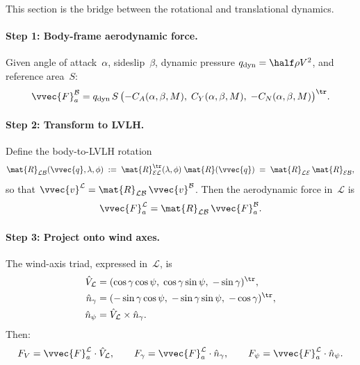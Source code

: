 This section is the bridge between the rotational and translational
dynamics.

\paragraph{Step 1: Body-frame aerodynamic force.}
Given angle of attack~$\alpha$, sideslip~$\beta$, dynamic pressure
$q_{\mathrm{dyn}} = \half\rho V^2$, and reference area~$S$:
\begin{equation}\label{eq:Fa-body}
  \vvec{F}_a^{\mathcal{B}}
  = q_{\mathrm{dyn}}\,S\,
    \bigl(-C_A(\alpha,\beta,M),\;
           C_Y(\alpha,\beta,M),\;
          -C_N(\alpha,\beta,M)\bigr)^\tr.
\end{equation}

\paragraph{Step 2: Transform to LVLH.}
Define the body-to-LVLH rotation
\begin{equation}\label{eq:RLB}
  \mat{R}_{\mathcal{L}\mathcal{B}}({\vvec{q}},\lambda,\phi)
  \;:=\;
  \mat{R}_{\mathcal{E}\mathcal{L}}^\tr(\lambda,\phi)\;
  \mat{R}(\vvec{q})
  \;=\;
  \mat{R}_{\mathcal{L}\mathcal{E}}\,\mat{R}_{\mathcal{E}\mathcal{B}},
\end{equation}
so that $\vvec{v}^{\mathcal{L}} =
\mat{R}_{\mathcal{L}\mathcal{B}}\,\vvec{v}^{\mathcal{B}}$. Then the
aerodynamic force in~$\mathcal{L}$ is
\begin{equation}\label{eq:Fa-LVLH}
  \vvec{F}_a^{\mathcal{L}}
  = \mat{R}_{\mathcal{L}\mathcal{B}}\,
    \vvec{F}_a^{\mathcal{B}}.
\end{equation}

\paragraph{Step 3: Project onto wind axes.}
The wind-axis triad, expressed in~$\mathcal{L}$, is
\begin{align}
  \hat{V}_{\mathcal{L}} &= (\cos\gamma\cos\psi,\;
                      \cos\gamma\sin\psi,\;-\sin\gamma)^\tr,
                                                    \label{eq:Vhat}\\
  \hat{n}_\gamma &= (-\sin\gamma\cos\psi,\;
                      -\sin\gamma\sin\psi,\;
                      -\cos\gamma)^\tr, \label{eq:ngam}\\
  \hat{n}_\psi   &= \hat{V}_{\mathcal{L}} \times \hat{n}_\gamma.
                                                    \label{eq:npsi}
\end{align}
Then:
\begin{equation}\label{eq:F-projections}
  F_V = \vvec{F}_a^{\mathcal{L}}\cdot\hat{V}_{\mathcal{L}},\qquad
  F_\gamma = \vvec{F}_a^{\mathcal{L}}\cdot\hat{n}_\gamma,\qquad
  F_\psi = \vvec{F}_a^{\mathcal{L}}\cdot\hat{n}_\psi.
\end{equation}

